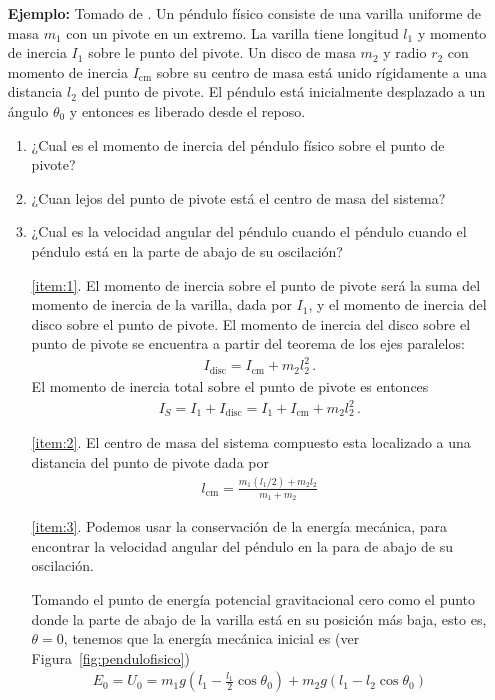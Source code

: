 \begin{itemize}
\item[\textbf{Ejemplo:}] Tomado de \cite{mit2009}. Un péndulo físico consiste de una varilla uniforme de masa $m_1$ con un pivote en un extremo. La varilla tiene longitud $l_1$ y momento de inercia $I_1$  sobre le punto del pivote. Un disco de masa $m_2$ y radio $r_2$ con momento de inercia $I_{\text{cm}}$ sobre su centro de masa está unido rígidamente a una distancia $l_2$ del punto de pivote. El péndulo está inicialmente desplazado a un ángulo $\theta_0$ y entonces es liberado desde el reposo.
  \begin{enumerate}
  \item ¿Cual es el momento de inercia del péndulo físico sobre el punto de pivote?
    \label{item:1}
  \item ¿Cuan lejos del punto de pivote está el centro de masa del sistema?
    \label{item:2}
  \item ¿Cual es la velocidad angular del péndulo cuando el péndulo cuando el péndulo está en la parte de abajo de su oscilación?
\label{item:3}

\ref{item:1}. El momento de inercia sobre el punto de pivote será la suma del momento de inercia de la varilla, dada por $I_1$, y el momento de inercia del disco sobre el punto de pivote. El momento de inercia del disco sobre el punto de pivote se encuentra a partir del teorema de los ejes paralelos:
\begin{align}
  I_{\text{disc}}=I_{\text{cm}}+m_2 l_2^2\,.
\end{align}
El momento de inercia total sobre el punto de pivote es entonces
\begin{align}
  \label{eq:rig3}
  I_S=I_1+I_{\text{disc}}=I_1+I_{\text{cm}}+m_2 l_2^2\,.
\end{align}

\ref{item:2}. El centro de masa del sistema compuesto esta localizado a una distancia del punto de pivote dada por
\begin{align}
  \label{eq:rig5}
  l_{\text{cm}}=\frac{m_1(l_1/2)+m_2 l_2}{m_1+m_2}
\end{align}

\ref{item:3}. Podemos usar la conservación de la energía mecánica, para encontrar la velocidad angular del péndulo en la para de abajo de su oscilación. 

Tomando el punto de energía potencial gravitacional cero como el punto donde la parte de abajo de la varilla está en su posición más baja, esto es, $\theta=0$, tenemos que la energía mecánica inicial es (ver Figura~\ref{fig:pendulofisico})
\begin{align}
  E_0=U_0=m_1 g  \left(l_1-\frac{l_1}{2}\cos\theta_0  \right)
+m_2 g  \left(l_1-l_2\cos\theta_0  \right)
\end{align}


\end{enumerate}
\end{itemize}
